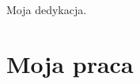 \documentclass[oneside,polski]{amuthesis}
\author{Jan Kowalski}
\date{Poznań, wrzesień 2017}
\begin{document}
\maketitle
\makestatement

\begin{streszczenie}
\lipsum[1]
\end{streszczenie}

\begin{abstract}
\lipsum[2]
\end{abstract}

\begin{dedykacja}
Moja dedykacja.
\end{dedykacja}

\tableofcontents

\chapter{Moja praca}

\lipsum[3]
\end{document}
